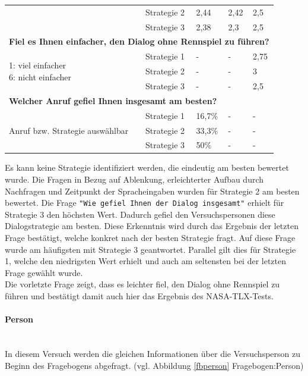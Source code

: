 \documentclass[12pt,a4paper]{scrartcl}
\begin{document}
\begin{longtable}{|p{4cm}|p{2cm}|p{2cm}|p{2cm}|p{2cm}|}
 & Strategie 2 & 2,44 & 2,42 & 2,5 \\
 & Strategie 3 & 2,38 & 2,3 & 2,5 \\
\hline
		\multicolumn{5}{l}{\textbf{Fiel es Ihnen einfacher, den Dialog ohne Rennspiel zu führen?}}\\
		\hline
\multirow{3}{4cm}{1: viel einfacher \newline  6: nicht einfacher} & Strategie 1 & - & - & 2,75 \\
- & Strategie 2 & - & - & 3 \\
- & Strategie 3 & - & - & 2,5\\
\hline
		\multicolumn{5}{l}{\textbf{Welcher Anruf gefiel Ihnen insgesamt am besten?}}\\
		\hline
\multirow{3}{4cm}{Anruf bzw. Strategie auswählbar} & Strategie 1 & 16,7\% &-  &-  \\
 & Strategie 2 & 33,3\% & - & - \\
 & Strategie 3 & 50\% & - &  -\\
\hline
\end{longtable}

Es kann keine Strategie identifiziert werden, die eindeutig am besten bewertet wurde. 
Die Fragen in Bezug auf Ablenkung, erleichterter Aufbau durch Nachfragen und Zeitpunkt der Spracheingaben wurden für Strategie 2 am besten bewertet.
Die Frage \texttt{"Wie gefiel Ihnen der Dialog insgesamt"} erhielt für Strategie 3 den höchsten Wert. Dadurch gefiel den Versuchspersonen diese Dialogstrategie am besten. Diese Erkenntnis wird durch das Ergebnis der letzten Frage bestätigt, welche konkret nach der besten Strategie fragt. Auf diese Frage wurde am häufigsten mit Strategie 3 geantwortet. Parallel gilt dies für Strategie 1, welche den niedrigsten Wert erhielt und auch am seltensten bei der letzten Frage gewählt wurde. \\

Die vorletzte Frage zeigt, dass es leichter fiel, den Dialog ohne Rennspiel zu führen und bestätigt damit auch hier das Ergebnis des NASA-TLX-Tests.

\paragraph{Person}
\label{fbperson2}
~\\
In diesem Versuch werden die gleichen Informationen über die Versuchsperson zu Beginn des Fragebogens abgefragt. (vgl. Abbildung \ref{fbperson}  Fragebogen:Person)\\
\end{document}
